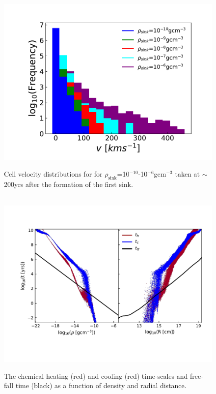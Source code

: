 \documentclass[fleqn,usenatbib]{mnras}
\begin{document}
\begin{figure}

	 \hbox{\hspace{-1cm}  \includegraphics[scale=0.6]{velocities.pdf}}
    \caption{Cell velocity distributions for for $\rho_{\text{sink}}$=10$^{-10}$-10$^{-6}$gcm$^{-3}$ taken at $\sim$200yrs after the formation of the first sink.}
    \label{fig:cooling}
\end{figure}

\begin{figure}

	 \hbox{\hspace{-1cm}  \includegraphics[scale=0.6]{cooling.pdf}}
    \caption{The chemical heating (red) and cooling (red) time-scales and free-fall time (black) as a function of density and radial distance.}
    \label{fig:cooling}
\end{figure}
\end{document}
